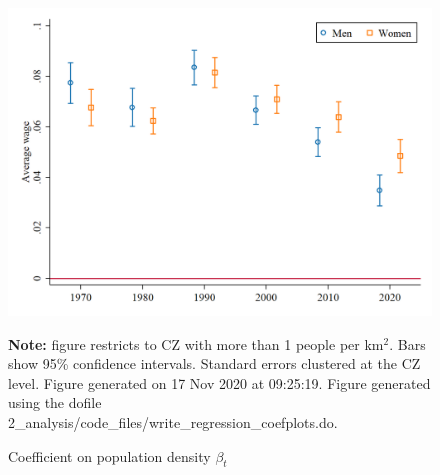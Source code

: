 \begin{figure}[!h]
\centering
\caption{Coefficient on population density $ \beta_t $}
\includegraphics[width=1\textwidth]{../2_analysis/output/figures/premium_by_gender_full_time}
\par \begin{minipage}[h]{\textwidth}{\tiny\textbf{Note:} figure restricts to CZ with more than 1 people per km$^2$. Bars show 95\% confidence intervals. Standard errors clustered at the CZ level. Figure generated on 17 Nov 2020 at 09:25:19. Figure generated using the dofile 2\_analysis/code\_files/write\_regression\_coefplots.do.}\end{minipage}
\end{figure}
